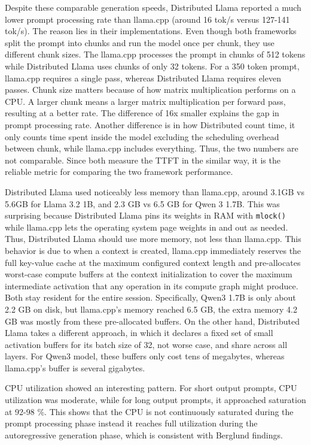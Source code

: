 Despite these comparable generation speeds, Distributed Llama reported a much lower prompt processing rate than llama.cpp (around 16 tok/s versus 127-141 tok/s). The reason lies in their implementations. Even though both frameworks split the prompt into chunks and run the model once per chunk, they use different chunk sizes. The llama.cpp processes the prompt in chunks of 512 tokens while Distributed Llama uses chunks of only 32 tokens. For a 350 token prompt, llama.cpp requires a single pass, whereas Distributed Llama requires eleven passes. Chunk size matters because of how matrix multiplication performs on a CPU. A larger chunk means a larger matrix multiplication per forward pass, resulting at a better rate. The difference of 16x smaller explains the gap in prompt processing rate. Another difference is in how Distributed count time, it only counts time spent inside the model excluding the scheduling overhead between chunk, while llama.cpp includes everything. Thus, the two numbers are not comparable. Since both measure the TTFT in the similar way, it is the reliable metric for comparing the two framework performance.

Distributed Llama used noticeably less memory than llama.cpp, around 3.1GB vs 5.6GB for Llama 3.2 1B, and 2.3 GB vs 6.5 GB for Qwen 3 1.7B. This was surprising because Distributed Llama pins its weights in RAM with \verb|mlock()| while llama.cpp lets the operating system page weights in and out as needed. Thus, Distributed Llama should use more memory, not less than llama.cpp. This behavior is due to when a context is created, llama.cpp immediately reserves the full key-value cache at the maximum configured context length and pre-allocates worst-case compute buffers at the context initialization to cover the maximum intermediate activation that any operation in its compute graph might produce. Both stay resident for the entire session. Specifically, Qwen3 1.7B is only about 2.2 GB on disk, but llama.cpp's memory reached 6.5 GB, the extra memory 4.2 GB was mostly from these pre-allocated buffers. On the other hand, Distributed Llama takes a different approach, in which it declares a fixed set of small activation buffers for its batch size of 32, not worse case, and share across all layers. For Qwen3 model, these buffers only cost tens of megabytes, whereas llama.cpp's buffer is several gigabytes. 

CPU utilization showed an interesting pattern. For short output prompts, CPU utilization was moderate, while for long output prompts, it approached saturation at 92-98 \%. This shows that the CPU is not continuously saturated during the prompt processing phase instead it reaches full utilization during the autoregressive generation phase, which is consistent with Berglund \cite{RN12} findings.


